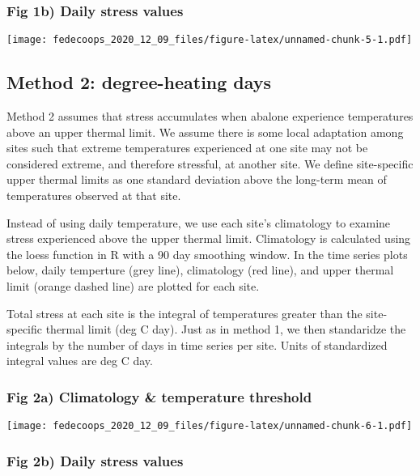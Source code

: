 \documentclass[]{article}
\begin{document}
\hypertarget{fig-1b-daily-stress-values}{%
\subsubsection{Fig 1b) Daily stress
values}\label{fig-1b-daily-stress-values}}

\texttt{[image: fedecoops\_2020\_12\_09\_files/figure-latex/unnamed-chunk-5-1.pdf]}

\hypertarget{method-2-degree-heating-days}{%
\subsection{Method 2: degree-heating
days}\label{method-2-degree-heating-days}}

Method 2 assumes that stress accumulates when abalone experience
temperatures above an upper thermal limit. We assume there is some local
adaptation among sites such that extreme temperatures experienced at one
site may not be considered extreme, and therefore stressful, at another
site. We define site-specific upper thermal limits as one standard
deviation above the long-term mean of temperatures observed at that
site.

Instead of using daily temperature, we use each site's climatology to
examine stress experienced above the upper thermal limit. Climatology is
calculated using the loess function in R with a 90 day smoothing window.
In the time series plots below, daily temperture (grey line),
climatology (red line), and upper thermal limit (orange dashed line) are
plotted for each site.

Total stress at each site is the integral of temperatures greater than
the site-specific thermal limit (deg C day). Just as in method 1, we
then standaridze the integrals by the number of days in time series per
site. Units of standardized integral values are deg C day.

\hypertarget{fig-2a-climatology-temperature-threshold}{%
\subsubsection{Fig 2a) Climatology \& temperature
threshold}\label{fig-2a-climatology-temperature-threshold}}

\texttt{[image: fedecoops\_2020\_12\_09\_files/figure-latex/unnamed-chunk-6-1.pdf]}

\hypertarget{fig-2b-daily-stress-values}{%
\subsubsection{Fig 2b) Daily stress
values}\label{fig-2b-daily-stress-values}}
\end{document}
